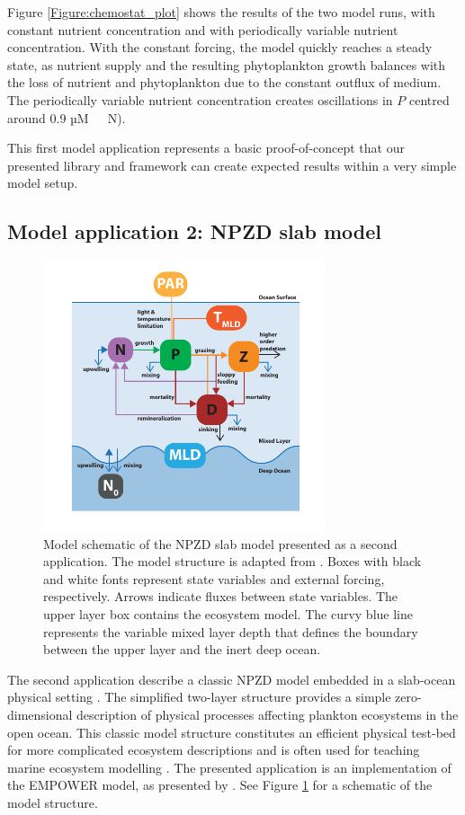 \documentclass[journal abbreviation, manuscript]{copernicus}
\begin{document}
Figure \ref{Figure:chemostat_plot} shows the results of the two model runs, with constant nutrient concentration and with periodically variable nutrient concentration.
With the constant forcing, the model quickly reaches a steady state, as nutrient supply and the resulting phytoplankton growth balances with the loss of nutrient and phytoplankton due to the constant outflux of medium. The periodically variable nutrient concentration creates oscillations in $P$ centred around 0.9 \unit{µM \ N}).

This first model application represents a basic proof-of-concept that our presented library and framework can create expected results within a very simple model setup.

\subsection{Model application 2: NPZD slab model}
\begin{figure}[t]
\includegraphics[width=8.3cm]{Figures/firstdraft_schematics/02_schematics_EMPOWER.pdf}
\caption{Model schematic of the NPZD slab model presented as a second application. The model structure is adapted
from \citet{Anderson2015c}. Boxes with black and white fonts represent state variables and external forcing, respectively. Arrows indicate fluxes between state variables. The upper layer box contains the ecosystem model. The curvy blue line represents the variable mixed layer depth that defines the boundary between the upper layer and the inert deep ocean.}
\label{Figure:ModelSchematics_2}
\end{figure}

The second application describe a classic NPZD model embedded in a slab-ocean physical setting \citep[e.g.,][]{Evans1985ACycles, Fasham1990a}. The simplified two-layer structure provides a simple zero-dimensional description of physical processes affecting plankton ecosystems in the open ocean. This classic model structure constitutes an efficient physical test-bed for more complicated ecosystem descriptions and is often used for teaching marine ecosystem modelling \citep{Anderson2015c}. The presented application is an implementation of the EMPOWER model, as presented by \citet{Anderson2015c}. See Figure \ref{Figure:ModelSchematics_2} for a schematic of the model structure.
\end{document}
